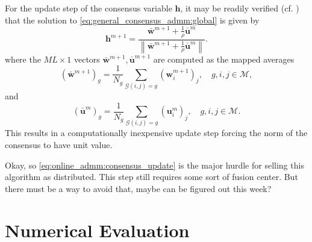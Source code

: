 \documentclass{article}
\newcommand{\hf}{{\bm{h}}}
\newcommand{\wf}{{\bm{w}}}
\newcommand{\uuf}{{\bm{u}}}
\newcommand{\Mset}{\mathcal{M}}
\begin{document}
For the update step of the consensus variable \(\hf\), it may be readily verified (cf. \cite{boydDistributedOptimizationStatistical2011}) that the solution to \eqref{eq:general_consensus_admm:global} is given by
\begin{equation}
    \hf^{m+1} = \frac{\bar{\wf}^{m+1} + \frac{1}{\rho} \bar{\uuf}^{m} }{\left\| \bar{\wf}^{m+1} + \frac{1}{\rho} \bar{\uuf}^{m} \right\|}.\label{eq:online_admm:consensus_update}
\end{equation}
where the \(M L \times 1\) vectors \(\bar{\wf}^{m+1}, \bar{\uuf}^{m+1}\) are computed as the mapped averages
\begin{equation}
    (\bar{\wf}^{m+1})_g = \frac{1}{N_g} \sum_{\mathcal{G}(i,j)=g} (\wf_i^{m+1})_j,\quad g,i,j \in \Mset,
\end{equation}
and
\begin{equation}
    (\bar{\uuf}^{m})_g = \frac{1}{N_g} \sum_{\mathcal{G}(i,j)=g} (\uuf_i^{m})_j,\quad g,i,j \in \Mset.
\end{equation}
This results in a computationally inexpensive update step forcing the norm of the consensus to have unit value.
\begin{todo}
    Okay, so \eqref{eq:online_admm:consensus_update} is the major hurdle for selling this algorithm as distributed. This step still requires some sort of fusion center. But there must be a way to avoid that, maybe can be figured out this week?
\end{todo}

\section{Numerical Evaluation}
\label{sec:perf_eval}
\end{document}

